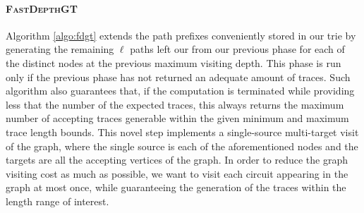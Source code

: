 \documentclass[sigconf]{acmart}
\begin{document}









\paragraph*{\textsc{FastDepthGT}}    Algorithm \ref{algo:fdgt} extends the path prefixes conveniently stored in our trie by generating the remaining $\ell$ paths left our from our previous phase for each of the distinct nodes at the previous maximum visiting depth.
This phase  is run only if the previous phase has not returned an adequate amount of traces. Such algorithm also guarantees that, if the computation is terminated while providing less that the number of the expected traces, this always returns the maximum number of accepting traces generable within the given minimum and maximum trace length bounds.
 This novel step implements a single-source multi-target visit of the graph, where the single source is each of the aforementioned nodes and the targets are all the accepting vertices of the graph. In order to reduce the graph visiting cost as much as possible, we want to visit each circuit appearing in the graph at most once, while guaranteeing the generation of the traces within the length range of interest. 
\end{document}
